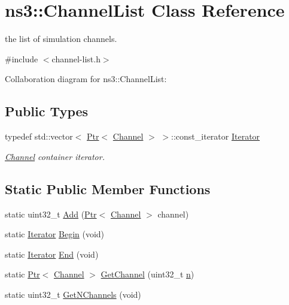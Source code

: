 \hypertarget{classns3_1_1ChannelList}{}\section{ns3\+:\+:Channel\+List Class Reference}
\label{classns3_1_1ChannelList}


the list of simulation channels.  




{\ttfamily \#include $<$channel-\/list.\+h$>$}



Collaboration diagram for ns3\+:\+:Channel\+List\+:
\subsection*{Public Types}
\begin{DoxyCompactItemize}
\item 
typedef std\+::vector$<$ \hyperlink{classns3_1_1Ptr}{Ptr}$<$ \hyperlink{classns3_1_1Channel}{Channel} $>$ $>$\+::const\+\_\+iterator \hyperlink{classns3_1_1ChannelList_a5c0e48f322c6bc465eccfb0a8186d6d6}{Iterator}
\begin{DoxyCompactList}\small\item\em \hyperlink{classns3_1_1Channel}{Channel} container iterator. \end{DoxyCompactList}\end{DoxyCompactItemize}
\subsection*{Static Public Member Functions}
\begin{DoxyCompactItemize}
\item 
static uint32\+\_\+t \hyperlink{classns3_1_1ChannelList_a30bd29e7ecc159bc3a615402726e72ed}{Add} (\hyperlink{classns3_1_1Ptr}{Ptr}$<$ \hyperlink{classns3_1_1Channel}{Channel} $>$ channel)
\item 
static \hyperlink{classns3_1_1ChannelList_a5c0e48f322c6bc465eccfb0a8186d6d6}{Iterator} \hyperlink{classns3_1_1ChannelList_a0fd6970028d46e4b7259763411f761b4}{Begin} (void)
\item 
static \hyperlink{classns3_1_1ChannelList_a5c0e48f322c6bc465eccfb0a8186d6d6}{Iterator} \hyperlink{classns3_1_1ChannelList_a2d999ce2d7a01e5c1470c852630e3cee}{End} (void)
\item 
static \hyperlink{classns3_1_1Ptr}{Ptr}$<$ \hyperlink{classns3_1_1Channel}{Channel} $>$ \hyperlink{classns3_1_1ChannelList_a1c66c473f6e9d2fd15d9b21c6ab6e371}{Get\+Channel} (uint32\+\_\+t \hyperlink{lte__link__budget__x2__handover__measures_8m_abdb05bc5a064cf642a06c83b3392f148}{n})
\item 
static uint32\+\_\+t \hyperlink{classns3_1_1ChannelList_aa37022f9f0ae5ca784f6fc43a6fdbc49}{Get\+N\+Channels} (void)
\end{DoxyCompactItemize}


